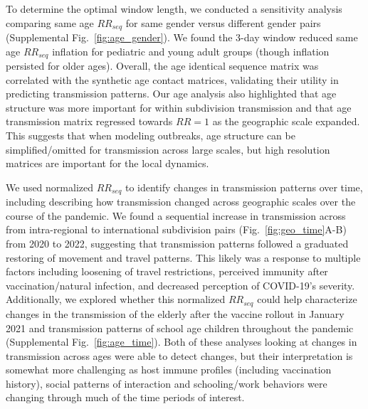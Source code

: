\documentclass[11pt, letterpaper, oneside]{article}
\begin{document}
To determine the optimal window length, we conducted a sensitivity analysis comparing same age $RR_{seq}$ for same gender versus different gender pairs (Supplemental Fig.\ \ref{fig:age_gender}).
We found the 3-day window reduced same age $RR_{seq}$ inflation for pediatric and young adult groups (though inflation persisted for older ages).
Overall, the age identical sequence matrix was correlated with the synthetic age contact matrices, validating their utility in predicting transmission patterns.\autocite{mistryInferringHighresolutionHuman2021}
Our age analysis also highlighted that age structure was more important for within subdivision transmission and that age transmission matrix regressed towards $RR = 1$ as the geographic scale expanded.
This suggests that when modeling outbreaks, age structure can be simplified/omitted for transmission across large scales, but high resolution matrices are important for the local dynamics.

We used normalized $RR_{seq}$ to identify changes in transmission patterns over time, including describing how transmission changed across geographic scales over the course of the pandemic.
We found a sequential increase in transmission across from intra-regional to international subdivision pairs (Fig.\ \ref{fig:geo_time}A-B) from 2020 to 2022, suggesting that transmission patterns followed a graduated restoring of movement and travel patterns.
This likely was a response to multiple factors including loosening of travel restrictions, perceived immunity after vaccination/natural infection, and decreased perception of COVID-19's severity.
Additionally, we explored whether this normalized $RR_{seq}$ could help characterize changes in the transmission of the elderly after the vaccine rollout in January 2021 and transmission patterns of school age children throughout the pandemic (Supplemental Fig.\ \ref{fig:age_time}).
Both of these analyses looking at changes in transmission across ages were able to detect changes, but their interpretation is somewhat more challenging as host immune profiles (including vaccination history), social patterns of interaction and schooling/work behaviors were changing through much of the time periods of interest.
\end{document}
